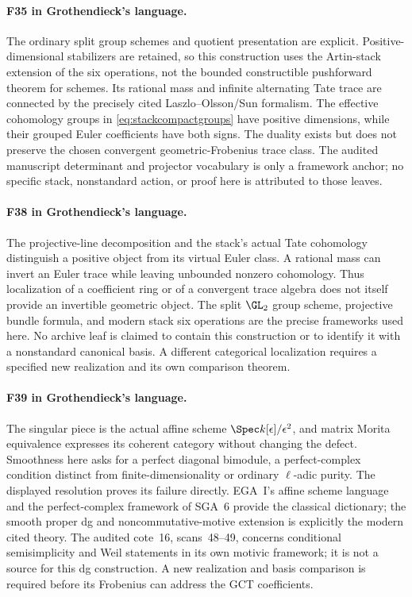\documentclass[11pt,a4paper]{article}
\newcommand{\fid}[1]{\textsf{#1}}\newcommand{\gate}[1]{\textsf{#1}}
\theoremstyle{named}\newtheorem{finding}{Finding}[section]
\theoremstyle{definition}\newtheorem{definition}[finding]{Definition}
\theoremstyle{remark}\newtheorem{remark}[finding]{Remark}
\begin{document}
\paragraph{\fid{F35} in Grothendieck's language.}
The ordinary split group schemes and quotient presentation are
explicit. Positive-dimensional stabilizers are retained, so this
construction uses the Artin-stack extension of the six operations,
not the bounded constructible pushforward theorem for schemes.
Its rational mass and infinite alternating Tate trace are connected
by the precisely cited Laszlo--Olsson/Sun formalism. The effective
cohomology groups in \eqref{eq:stackcompactgroups} have positive
dimensions, while their grouped Euler coefficients have both signs.
The duality exists but does not preserve the chosen convergent
geometric-Frobenius trace class. The audited manuscript determinant
and projector vocabulary is only a framework anchor; no specific
stack, nonstandard action, or proof here is attributed to those leaves.

\paragraph{\fid{F38} in Grothendieck's language.}
The projective-line decomposition and the stack's actual Tate
cohomology distinguish a positive object from its virtual Euler
class. A rational mass can invert an Euler trace while leaving
unbounded nonzero cohomology. Thus localization of a coefficient
ring or of a convergent trace algebra does not itself provide an
invertible geometric object. The split $\GL_2$ group scheme,
projective bundle formula, and modern stack six operations are
the precise frameworks used here. No archive leaf is claimed to
contain this construction or to identify it with a nonstandard
canonical basis. A different categorical localization requires a
specified new realization and its own comparison theorem.

\paragraph{\fid{F39} in Grothendieck's language.}
The singular piece is the actual affine scheme
$\Spec k[\epsilon]/\epsilon^2$, and matrix Morita equivalence
expresses its coherent category without changing the defect.
Smoothness here asks for a perfect diagonal bimodule, a perfect-complex
condition distinct from finite-dimensionality or ordinary $\ell$-adic
purity. The displayed resolution proves its failure directly. EGA~I's
affine scheme language and the perfect-complex framework of SGA~6
provide the classical dictionary; the smooth proper dg and
noncommutative-motive extension is explicitly the modern cited theory.
The audited cote~16, scans~48--49, concerns conditional semisimplicity
and Weil statements in its own motivic framework; it is not a source
for this dg construction. A new realization and basis comparison is
required before its Frobenius can address the GCT coefficients.
\end{document}
